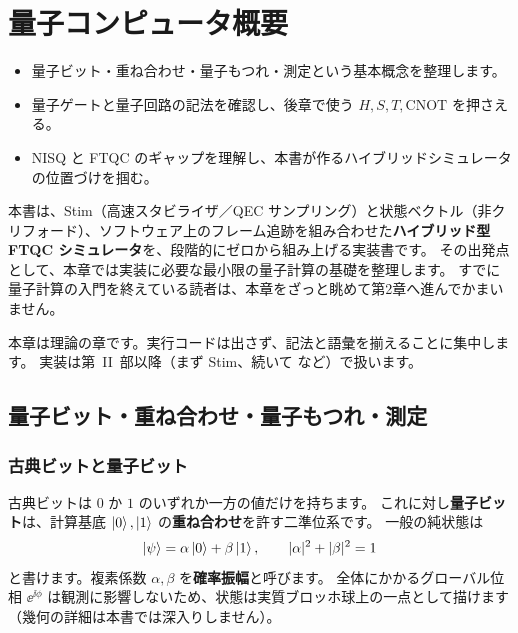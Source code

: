 \chapter{量子コンピュータ概要}\label{ch:overview}

\begin{chaptergoal}
  \begin{itemize}
  \item 量子ビット・重ね合わせ・量子もつれ・測定という基本概念を整理します。
  \item 量子ゲートと量子回路の記法を確認し、後章で使う $H,S,T,\mathrm{CNOT}$ を押さえる。
  \item NISQ と FTQC のギャップを理解し、本書が作るハイブリッドシミュレータの位置づけを掴む。
  \end{itemize}
\end{chaptergoal}

本書は、Stim（高速スタビライザ／QEC サンプリング）と状態ベクトル（非クリフォード）、ソフトウェア上のフレーム追跡を組み合わせた\textbf{ハイブリッド型 FTQC シミュレータ}を、段階的にゼロから組み上げる実装書です。
その出発点として、本章では実装に必要な最小限の量子計算の基礎を整理します。
すでに量子計算の入門を終えている読者は、本章をざっと眺めて第2章へ進んでかまいません。

\begin{notebox}
  本章は理論の章です。実行コードは出さず、記法と語彙を揃えることに集中します。
  実装は第~II~部以降（まず Stim、続いて  など）で扱います。
\end{notebox}

\section{量子ビット・重ね合わせ・量子もつれ・測定}\label{sec:qubit}

\subsection{古典ビットと量子ビット}

古典ビットは $0$ か $1$ のいずれか一方の値だけを持ちます。
これに対し\textbf{量子ビット}は、計算基底 $\ket{0},\ket{1}$ の\textbf{重ね合わせ}を許す二準位系です。
一般の純状態は
\begin{equation}
  \ket{\psi}
  = \alpha\ket{0} + \beta\ket{1},
  \qquad
  |\alpha|^2 + |\beta|^2 = 1
\end{equation}
と書けます。複素係数 $\alpha,\beta$ を\textbf{確率振幅}と呼びます。
全体にかかるグローバル位相 $\ee^{\ii\phi}$ は観測に影響しないため、状態は実質ブロッホ球上の一点として描けます（幾何の詳細は本書では深入りしません）。

